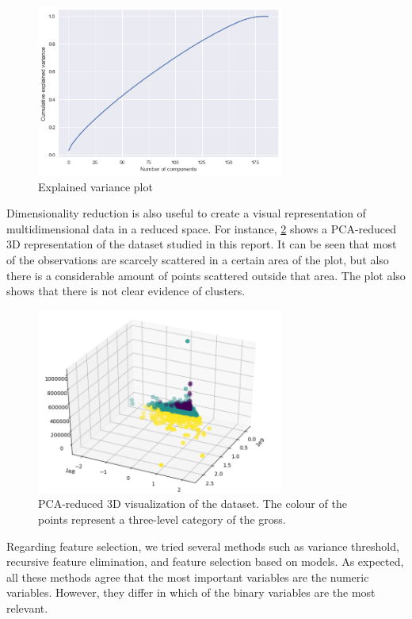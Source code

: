 \begin{figure}[h]
\centering
\includegraphics[width=3.2in]{figures/variance}
\caption{Explained variance plot} 
\label{fig:variance}
\end{figure}

Dimensionality reduction is also useful to create a visual representation of multidimensional data in a reduced space. For instance, \figurename{} \ref{fig:pca} shows a PCA-reduced 3D representation of the dataset studied in this report. It can be seen that most of the observations are scarcely scattered in a certain area of the plot, but also there is a considerable amount of points scattered outside that area. The plot also shows that there is not clear evidence of clusters. 

\begin{figure}[h]
\centering
\includegraphics[width=3.2in]{figures/pca}
\caption{PCA-reduced 3D visualization of the dataset. The colour of the points represent a three-level category of the gross.} 
\label{fig:pca}
\end{figure}

Regarding feature selection, we tried several methods such as variance threshold, recursive feature elimination, and feature selection based on models. As expected, all these methods agree that the most important variables are the numeric variables. However, they differ in which of the binary variables are the most relevant.

